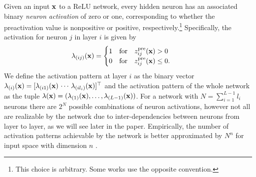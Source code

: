 Given an input $\mathbf{x}$ to a ReLU network, every hidden neuron has an associated binary \textit{neuron activation} of zero or one, corresponding to whether the preactivation value is nonpositive or positive, respectively.\footnote{This choice is arbitrary. Some works use the opposite convention.} Specifically, the activation for neuron $j$ in layer $i$ is given by
\begin{align}
\label{Eq:AP}
    \lambda_{(ij)}(\mathbf{x}) &= \begin{cases}
            1 \quad \text{for} \quad z^\text{pre}_{ij}(\mathbf{x}) > 0 \\    
            0 \quad \text{for} \quad z^\text{pre}_{ij}(\mathbf{x}) \le 0. 
                        \end{cases}
\end{align}
We define the activation pattern at layer $i$ as the binary vector $\mathbf{\lambda}_{(i)}(\mathbf{x}) = [\lambda_{(i1)}(\mathbf{x}) \, \cdots \, \lambda_{(i l_i)}(\mathbf{x})]^\top$ and the activation pattern of the whole network as the tuple $\lambda(\mathbf{x}) = (\mathbf{\lambda}_{(1)}(\mathbf{x}), \ldots, \mathbf{\lambda}_{(L-1)}(\mathbf{x}))$.  For a network with $N = \sum_{i = 1}^{L-1}l_i$ neurons there are $2^N$ possible combinations of neuron activations, however not all are realizable by the network due to inter-dependencies between neurons from layer to layer, as we will see later in the paper. Empirically, the number of activation patterns achievable by the network is better approximated by $N^{n}$ for input space with dimension $n$  \cite{hanin2019deep}. 

